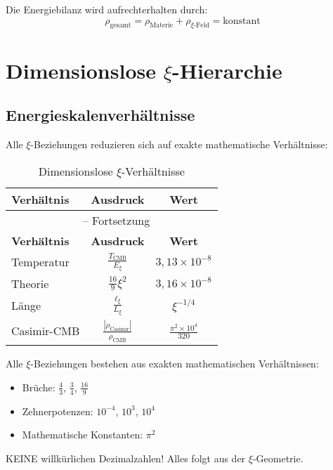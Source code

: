\documentclass[12pt,a4paper]{article}
\begin{document}
	Die Energiebilanz wird aufrechterhalten durch:
	\begin{equation}
		\rho_{\text{gesamt}} = \rho_{\text{Materie}} + \rho_{\xi\text{-Feld}} = \text{konstant}
	\end{equation}
	
	\section{Dimensionslose $\xi$-Hierarchie}
	
	\subsection{Energieskalenverhältnisse}
	
	Alle $\xi$-Beziehungen reduzieren sich auf exakte mathematische Verhältnisse:
	
	\begin{longtable}{lcc}
		\caption{Dimensionslose $\xi$-Verhältnisse} \\
		\toprule
		\textbf{Verhältnis} & \textbf{Ausdruck} & \textbf{Wert} \\
		\midrule
		\endfirsthead
		\multicolumn{3}{c}{\tablename\ \thetable{} -- Fortsetzung} \\
		\toprule
		\textbf{Verhältnis} & \textbf{Ausdruck} & \textbf{Wert} \\
		\midrule
		\endhead
		Temperatur & $\frac{T_{\text{CMB}}}{E_\xi}$ & $3{,}13 \times 10^{-8}$ \\
		Theorie & $\frac{16}{9}\xi^2$ & $3{,}16 \times 10^{-8}$ \\
		Länge & $\frac{\ell_{\xi}}{L_\xi}$ & $\xi^{-1/4}$ \\
		Casimir-CMB & $\frac{|\rho_{\text{Casimir}}|}{\rho_{\text{CMB}}}$ & $\frac{\pi^2 \times 10^4}{320}$ \\
		\bottomrule
	\end{longtable}
	
	\begin{important}
		Alle $\xi$-Beziehungen bestehen aus exakten mathematischen Verhältnissen:
		\begin{itemize}
			\item Brüche: $\frac{4}{3}$, $\frac{3}{4}$, $\frac{16}{9}$
			\item Zehnerpotenzen: $10^{-4}$, $10^3$, $10^4$
			\item Mathematische Konstanten: $\pi^2$
		\end{itemize}
		KEINE willkürlichen Dezimalzahlen! Alles folgt aus der $\xi$-Geometrie.
	\end{important}
	
\end{document}
